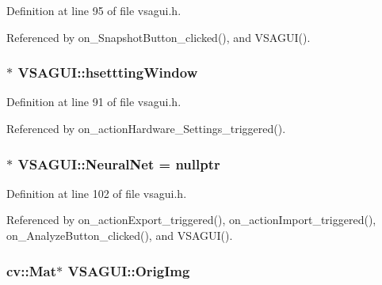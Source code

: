 Definition at line 95 of file vsagui.\+h.



Referenced by on\+\_\+\+Snapshot\+Button\+\_\+clicked(), and V\+S\+A\+G\+U\+I().

\hypertarget{class_v_s_a_g_u_i_ad7a55217e7216e0badaa15e12a7654ff}{}
\subsubsection[{hsettting\+Window}]{$\ast$ V\+S\+A\+G\+U\+I\+::hsettting\+Window\hspace{0.3cm}{\ttfamily [private]}}\label{class_v_s_a_g_u_i_ad7a55217e7216e0badaa15e12a7654ff}


Definition at line 91 of file vsagui.\+h.



Referenced by on\+\_\+action\+Hardware\+\_\+\+Settings\+\_\+triggered().

\hypertarget{class_v_s_a_g_u_i_aaf0cb2947a03baddcb811eaa07c299e3}{}
\subsubsection[{Neural\+Net}]{$\ast$ V\+S\+A\+G\+U\+I\+::\+Neural\+Net = nullptr\hspace{0.3cm}{\ttfamily [private]}}\label{class_v_s_a_g_u_i_aaf0cb2947a03baddcb811eaa07c299e3}


Definition at line 102 of file vsagui.\+h.



Referenced by on\+\_\+action\+Export\+\_\+triggered(), on\+\_\+action\+Import\+\_\+triggered(), on\+\_\+\+Analyze\+Button\+\_\+clicked(), and V\+S\+A\+G\+U\+I().

\hypertarget{class_v_s_a_g_u_i_ae74be8a44b34a65cb189d9b58ee40455}{}
\subsubsection[{Orig\+Img}]{\setlength{\rightskip}{0pt plus 5cm}cv\+::\+Mat$\ast$ V\+S\+A\+G\+U\+I\+::\+Orig\+Img\hspace{0.3cm}{\ttfamily [private]}}\label{class_v_s_a_g_u_i_ae74be8a44b34a65cb189d9b58ee40455}


